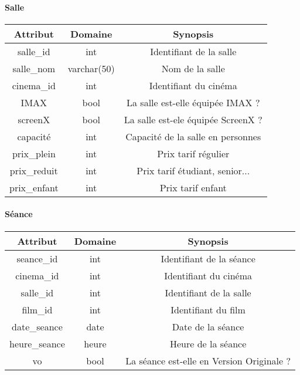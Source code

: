 \documentclass[12pt]{article}
\begin{document}
\paragraph*{Salle}
\begin{center}
    \begin{tabular}{||c c c||} 
     \hline
     Attribut & Domaine & Synopsis\\ [0.5ex] 
     \hline\hline
     {\color{blue} salle{\_}id} & int & Identifiant de la salle \\ 
     \hline
     salle{\_}nom & varchar(50) & Nom de la salle \\
     \hline
     cinema{\_}id & int & Identifiant du cinéma\\
     \hline
     IMAX & bool & La salle est-elle équipée IMAX ? \\
     \hline
     screenX & bool & La salle est-ele équipée ScreenX ? \\
     \hline
     capacité & int & Capacité de la salle en personnes \\
     \hline
     prix{\_}plein & int & Prix tarif régulier \\
     \hline
     prix{\_}reduit & int & Prix tarif étudiant, senior... \\
     \hline
     prix{\_}enfant & int & Prix tarif enfant \\
     \hline
    \end{tabular}
\end{center}
\pagebreak
\paragraph*{Séance}
\begin{center}
    \begin{tabular}{||c c c||} 
     \hline
     Attribut & Domaine & Synopsis\\ [0.5ex] 
     \hline\hline
     {\color{blue} seance{\_}id} & int & Identifiant de la séance \\ 
     \hline
     cinema{\_}id & int & Identifiant du cinéma \\
     \hline
     salle{\_}id & int & Identifiant de la salle\\
     \hline
     film{\_}id & int & Identifiant du film \\
     \hline
     date{\_}seance & date & Date de la séance \\
     \hline
     heure{\_}seance & heure & Heure de la séance \\
     \hline
     vo & bool & La séance est-elle en Version Originale ? \\
     \hline
    \end{tabular}
\end{center}
\end{document}
